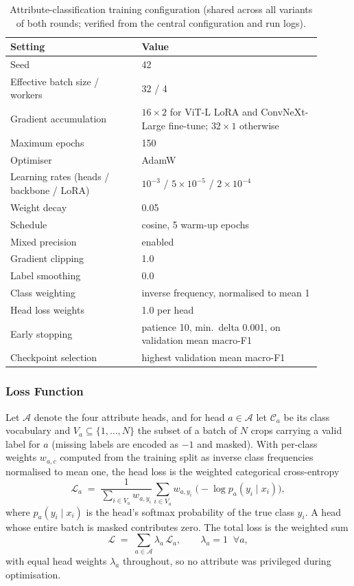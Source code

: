 \begin{table}[htbp]
\centering
\caption{Attribute-classification training configuration (shared across all variants of both rounds; verified from the central configuration and run logs).}
\label{tab:attr-hparams}
\small
\begin{tabular}{p{0.38\linewidth}p{0.52\linewidth}}
\hline
\textbf{Setting} & \textbf{Value} \\
\hline
Seed & 42 \\
Effective batch size / workers & 32 / 4 \\
Gradient accumulation & $16 \times 2$ for ViT-L LoRA and ConvNeXt-Large fine-tune; $32 \times 1$ otherwise \\
Maximum epochs & 150 \\
Optimiser & AdamW \\
Learning rates (heads / backbone / LoRA) & $10^{-3}$ / $5\times10^{-5}$ / $2\times10^{-4}$ \\
Weight decay & 0.05 \\
Schedule & cosine, 5 warm-up epochs \\
Mixed precision & enabled \\
Gradient clipping & 1.0 \\
Label smoothing & 0.0 \\
Class weighting & inverse frequency, normalised to mean 1 \\
Head loss weights & 1.0 per head \\
Early stopping & patience 10, min.\ delta 0.001, on validation mean macro-F1 \\
Checkpoint selection & highest validation mean macro-F1 \\
\hline
\end{tabular}
\end{table}

\subsubsection{Loss Function}

Let $\mathcal{A}$ denote the four attribute heads, and for head $a \in \mathcal{A}$ let $\mathcal{C}_a$ be its class vocabulary and $V_a \subseteq \{1,\dots,N\}$ the subset of a batch of $N$ crops carrying a valid label for $a$ (missing labels are encoded as $-1$ and masked). With per-class weights $w_{a,c}$ computed from the training split as inverse class frequencies normalised to mean one, the head loss is the weighted categorical cross-entropy
\begin{equation}
\mathcal{L}_a \;=\; \frac{1}{\sum_{i \in V_a} w_{a,y_i}} \sum_{i \in V_a} w_{a,y_i} \; \bigl( -\log p_a(y_i \mid x_i) \bigr),
\end{equation}
where $p_a(y_i \mid x_i)$ is the head's softmax probability of the true class $y_i$. A head whose entire batch is masked contributes zero. The total loss is the weighted sum
\begin{equation}
\mathcal{L} \;=\; \sum_{a \in \mathcal{A}} \lambda_a \, \mathcal{L}_a, \qquad \lambda_a = 1 \;\; \forall a,
\end{equation}
with equal head weights $\lambda_a$ throughout, so no attribute was privileged during optimisation.

